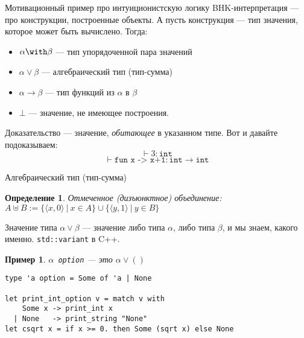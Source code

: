 \documentclass[aspectratio=169]{beamer}
\begin{document}
\newtheorem{axiom}{Аксиома}
\newtheorem{exmprus}{Пример}
\newtheorem{defrus}{Определение}
\newtheorem{lemmarus}{Лемма}
\newtheorem{thmrus}{Теорема}

\begin{frame}{Мотивационный пример про интуиционистскую логику}
BHK-интерпретация --- про конструкции, построенные объекты. А пусть конструкция --- тип значения,
которое может быть вычислено. Тогда:

\begin{itemize}
\item $\alpha\with\beta$ --- тип упорядоченной пара значений
\item $\alpha\vee\beta$ --- алгебраический тип (тип-сумма)
\item $\alpha\rightarrow\beta$ --- тип функций из $\alpha$ в $\beta$
\item $\bot$ --- значение, не имеющее построения.
\end{itemize}

Доказательство --- значение, \emph{обитающее} в указанном типе. Вот и давайте подоказываем:
$$\vdash 3 : \texttt{int}$$
$$\vdash \texttt{fun x -> x+1} : \texttt{int}\rightarrow\texttt{int}$$
\end{frame}

\begin{frame}[fragile]{Алгебраический тип (тип-сумма)}
\begin{defrus}Отмеченное (дизъюнктное) объединение: $A \uplus B := \{ \langle x, 0 \rangle\ |\ x \in A\} \cup \{ \langle y, 1\rangle\ |\ y \in B\}$\end{defrus}

Значение типа $\alpha\vee\beta$ --- значение либо типа $\alpha$, либо типа $\beta$, и мы знаем, какого именно. \verb!std::variant! в C++.

\begin{exmprus}$\alpha$\verb! option! --- это $\alpha\vee()$\end{exmprus}

\begin{verbatim}
type 'a option = Some of 'a | None

let print_int_option v = match v with
    Some x -> print_int x
  | None   -> print_string "None"
let csqrt x = if x >= 0. then Some (sqrt x) else None
\end{verbatim}

\end{frame}
\end{document}
